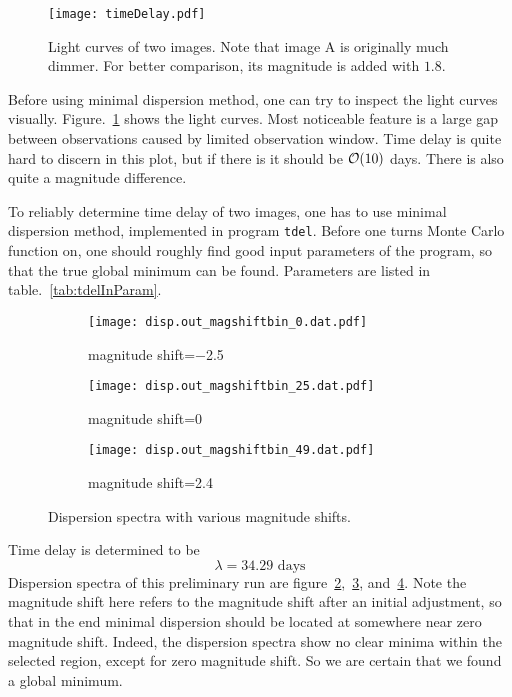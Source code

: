 \begin{figure}[H]
	\centering
	\texttt{[image: timeDelay.pdf]}
	\caption{Light curves of two images. Note that image A is originally much dimmer. For better comparison, its magnitude is added with $1.8$.}%
	\label{fig:timeDelay}
\end{figure}
Before using minimal dispersion method, one can try to inspect the light curves visually. Figure.~\ref{fig:timeDelay} shows the light curves. Most noticeable feature is a large gap between observations caused by limited observation window. Time delay is quite hard to discern in this plot, but if there is it should be $\order{10}$ days. There is also quite a magnitude difference.

To reliably determine time delay of two images, one has to use minimal dispersion method, implemented in program \verb|tdel|. Before one turns Monte Carlo function on, one should roughly find good input parameters of the program, so that the true global minimum can be found. Parameters are listed in table.~\ref{tab:tdelInParam}.

\begin{figure}[ht]
	\centering
	\begin{subfigure}[t]{\textwidth}
	\begin{center}
		\texttt{[image: disp.out\_magshiftbin\_0.dat.pdf]}
	\end{center}%
	\caption{magnitude shift=\num{-2.5}}
	\label{fig:disp1}
	\end{subfigure}
	\begin{subfigure}[t]{\textwidth}
	\begin{center}
		\texttt{[image: disp.out\_magshiftbin\_25.dat.pdf]}
	\end{center}%
	\caption{magnitude shift=\num{0}}
	\label{fig:disp2}
	\end{subfigure}
	\begin{subfigure}[t]{\textwidth}
	\begin{center}
		\texttt{[image: disp.out\_magshiftbin\_49.dat.pdf]}
	\end{center}%
	\caption{magnitude shift=\num{2.4}}
	\label{fig:disp3}
	\end{subfigure}%
	\caption{Dispersion spectra with various magnitude shifts.}%
	\label{fig:disp}
\end{figure}
Time delay is determined to be
\begin{equation}
	\lambda = \num{34.29} \text{ days}
\end{equation}
Dispersion spectra of this preliminary run are figure~\ref{fig:disp1},~\ref{fig:disp2}, and~\ref{fig:disp3}. Note the magnitude shift here refers to the magnitude shift after an initial adjustment, so that in the end minimal dispersion should be located at somewhere near zero magnitude shift. Indeed, the dispersion spectra show no clear minima within the selected region, except for zero magnitude shift. So we are certain that we found a global minimum.

